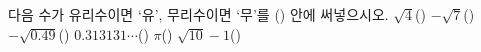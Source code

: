다음 수가 유리수이면 ‘유’, 무리수이면 ‘무’를 (\quad) 안에 써넣으시오.
 $\sqrt{4}$\hfill(\qquad)
 $-\sqrt{7}$\hfill(\qquad)
 $-\sqrt{0.49}$\hfill(\qquad)
 $0.313131\cdots$\hfill(\qquad)
 $\pi$\hfill(\qquad)
 $\sqrt{10}-1$\hfill(\qquad)
